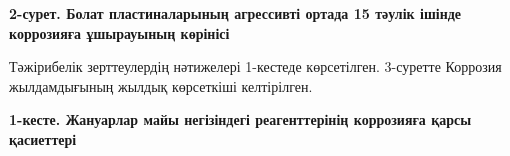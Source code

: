 {\bfseries 2-сурет. Болат пластиналарының агрессивті ортада 15 тәулік
ішінде коррозияға ұшырауының көрінісі}

Тәжірибелік зерттеулердің нәтижелері 1-кестеде көрсетілген. 3-суретте
Коррозия жылдамдығының жылдық көрсеткіші келтірілген.

{\bfseries 1-кесте. Жануарлар майы негізіндегі реагенттерінің коррозияға
қарсы қасиеттері}

% 
